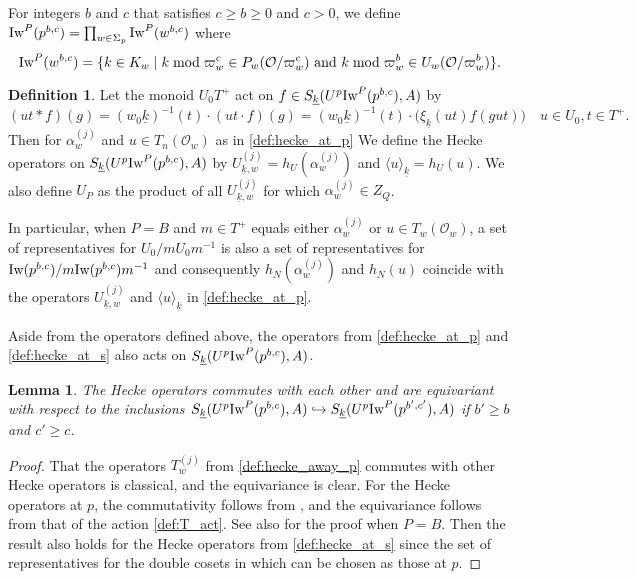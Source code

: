 \documentclass[leqno]{amsart}
\newtheorem{lem}[thm]{Lemma}
\theoremstyle{definition}
\newtheorem{defn}[thm]{Definition}
\theoremstyle{remark}
\newcommand{\oo}{\mathcal{O}}
\newcommand{\wt}[1]{\underline{ #1 }}
\newcommand{\Iw}{\textnormal{Iw}} %
\begin{document}
For integers $b$ and $c$ that satisfies $c\geq b\geq 0$ and $c>0$,
we define $\Iw^P(p^{b,c})=\prod_{w\in\Sigma_p}\Iw^P(w^{b,c})$ where
\begin{equation}\label{def:Iwahori_P}
	\Iw^P(w^{b,c})=\{
	k\in K_w\mid 
    k \bmod \varpi_w^c \in P_w(\oo/\varpi_w^c)
	\text{ and }
	k \bmod \varpi_w^b \in U_w(\oo/\varpi_w^b)
	\}.
\end{equation}


\begin{defn}\label{def:hecke}
Let the monoid $U_0T^+$ act on 
$f\in S_{\wt{k}}(U^p\Iw^P(p^{b,c}),A)$ by
\begin{equation}\label{def:T_act}
	(ut* f)(g)=(w_0\wt{k})^{-1}(t)\cdot (ut\cdot f)(g)=
    (w_0\wt{k})^{-1}(t)\cdot \big(\xi_{\wt{k}}(ut)f(gut)\big)\quad
    u\in U_0, t\in T^+.
\end{equation}
Then for $\alpha_w^{(j)}$ and $u\in T_n(\oo_w)$ 
as in \eqref{def:hecke_at_p}
We define the Hecke operators on
$S_{\wt{k}}(U^p\Iw^P(p^{b,c}),A)$ by
$U_{\wt{k},w}^{(j)}=h_U(\alpha_w^{(j)})$
and $\langle u\rangle_{\wt{k}}=h_U(u)$.
We also define $U_P$
as the product of all $U_{\wt{k},w}^{(j)}$
for which $\alpha_w^{(j)}\in Z_Q$.

In particular, when $P=B$
and $m\in T^+$ equals either $\alpha_{w}^{(j)}$ or $u\in T_w(\oo_w)$,
a set of representatives for $U_0/mU_0m^{-1}$
is also a set of representatives for 
$\Iw(p^{b,c})/m\Iw(p^{b,c})m^{-1}$
and consequently 
$h_N(\alpha_w^{(j)})$ and $h_N(u)$
coincide with the operators $U_{\wt{k},w}^{(j)}$ and 
$\langle u\rangle_{\wt{k}}$ in \eqref{def:hecke_at_p}.
\end{defn}

Aside from the operators defined above,
the operators from \eqref{def:hecke_at_p} and
\eqref{def:hecke_at_s} also 
acts on $S_{\wt{k}}(U^p\Iw^P(p^{b,c}),A)$.

\begin{lem}
The Hecke operators commutes with each other
and are equivariant with respect to the inclusions
$ S_{\wt{k}}(U^p\Iw^P(p^{b,c}),A)\hookrightarrow
S_{\wt{k}}(U^p\Iw^P(p^{b',c'}),A)$
if $b'\geq b$ and $c'\geq c$.
\end{lem}
\begin{proof}
That the operators $T_w^{(j)}$ from \eqref{def:hecke_away_p}
commutes with other Hecke operators is classical,
and the equivariance is clear.
For the Hecke operators at $p$,
the commutativity follows from \cite[Lem 3.1.4]{emeI},
and the equivariance follows from 
that of the action \eqref{def:T_act}.
See also \cite[Lem 2.10]{ger} for the proof when $P=B$.
Then the result also holds for the Hecke operators from 
\eqref{def:hecke_at_s}
since the set of representatives for the double cosets
in which can be chosen as those at $p$.
\end{proof}
\end{document}
